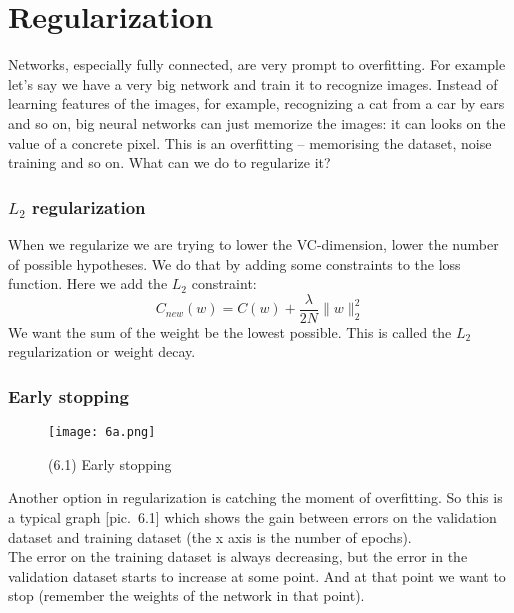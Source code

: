 \section{Regularization}

Networks, especially fully connected, are very prompt to overfitting. For example let's say we have a very big network and train it to recognize images. Instead of learning features of the images, for example, recognizing a cat from a car by ears and so on, big neural networks can just memorize the images: it can looks on the value of a concrete pixel. This is an overfitting -- memorising the dataset, noise training and so on. What can we do to regularize it? 

\subsubsection*{$L_2$ regularization}

When we regularize we are trying to lower the VC-dimension, lower the number of possible hypotheses. We do that by adding some constraints to the loss function. Here we add the $L_2$ constraint:
$$C_{new}(w)=C(w)+\frac{\lambda}{2N}\|w\|_2^2$$
We want the sum of the weight be the lowest possible. This is called the $L_2$ regularization or weight decay.

\subsubsection*{Early stopping}

\begin{wrapfigure}{r}{0.4\linewidth}
  \vspace{-1.3cm}
  \begin{center}
    \texttt{[image: 6a.png]}
  \end{center}
  \vspace{-0.3cm}
  \caption*{(6.1) Early stopping}
  \vspace{-1.5cm}
\end{wrapfigure}
Another option in regularization is catching the moment of overfitting. So this is a typical graph [pic.~6.1] which shows the gain between errors on the validation dataset and training dataset (the x axis is the number of epochs).\\
The error on the training dataset is always decreasing, but the error in the validation dataset starts to increase at some point. And at that point we want to stop (remember the weights of the network in that point).

